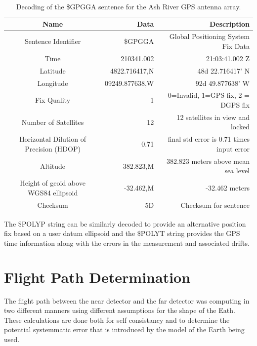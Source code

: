\begin{table}[thb]
\begin{center}
\begin{tabular}{| c |r | r|}
\hline
Name                     & Data                      & Description \\
\hline
Sentence Identifier & \$GPGGA              & Global Positioning System Fix Data \\
Time                      &  210341.002         & 21:03:41.002 Z \\
Latitude                 & 4822.716417,N     & 48d 22.716417' N \\
Longitude              & 09249.877638,W  & 92d 49.877638' W \\
Fix Quality             & 1                           & 0=Invalid,
1=GPS fix, 2 = DGPS fix \\
Number of Satellites & 12                      & 12 satellites in view
and locked \\
Horizontal Dilution of Precision (HDOP) & 0.71 & final std error is
0.71 times input error \\
Altitude                   & 382.823,M           & 382.823 meters
above mean sea level \\
Height of geoid above WGS84 ellipsoid & -32.462,M & -32.462 meters \\
Checksum               & \*5D & Checksum for sentence \\
\hline
\end{tabular}
\caption[GPGGA Sentence Decoding]{\label{table:gps_decode} Decoding of the \$GPGGA sentence for
the Ash River GPS antenna array.}
\end{center}
\end{table}

The \$POLYP string can be similarly decoded to provide an alternative
position fix based on a user datum ellipsoid and the \$POLYT string
provides the GPS time information along with the errors in the
measurement and associated drifts.

\section{Flight Path Determination}

The flight path between the near detector and the far detector was
computing in two different manners using different assumptions for the
shape of the Eath.  These calculations are done both for self
consistancy and to determine the potential systemmatic error that is
introduced by the model of the Earth being used.


